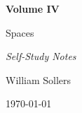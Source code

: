 \begin{titlepage}
\centering

\vspace*{5cm}

{\Huge\bfseries Volume IV\par}

\vspace{0.5cm}

{\LARGE Spaces\par}

\vspace{0.5cm}

{\large\itshape Self-Study Notes\par}

\vfill

{\large William Sollers\par}

\vspace{0.5cm}

{\large \today\par}

\end{titlepage}
